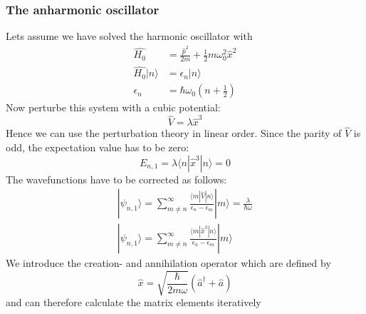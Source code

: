 \subsubsection{The anharmonic oscillator}
Lets assume we have solved the harmonic oscillator with 
\begin{align}
    \hat{H_0} &= \frac{\hat{p}^2}{2m} 
    + \frac{1}{2} m \omega_0^2\hat{x}^2 \\
    \hat{H_0}|n \rangle &= \epsilon_n |n \rangle \\
    \epsilon_n &= \hbar \omega_0 \left (n+ \frac{1}{2} \right)
\end{align}
Now perturbe this system with a cubic potential:
\begin{equation}
\hat{V} =\lambda \hat{x}^3
\end{equation}
Hence we can use the perturbation theory in linear order.
Since the parity of $\hat{V}$ is odd, the expectation value has 
to be zero:
\begin{equation}
    E_{n,1} = \lambda \langle n | \hat{x}^3 | n \rangle = 0 
\end{equation}
The wavefunctions have to be corrected as follows:
\begin{eqnarray}
    |\psi_{n,1} \rangle = \sum_{m\neq n}^{\infty}
    \frac{\langle m |\hat{V}|n \rangle}{\epsilon_n - \epsilon_m}  
    |m \rangle 
    = \frac{\lambda}{\hbar \omega}  \\
    |\psi_{n,1} \rangle = \sum_{m\neq n}^{\infty}
    \frac{\langle m |\hat{x}^3|n \rangle}{\epsilon_n - \epsilon_m}  
    |m \rangle 
\end{eqnarray}
We introduce the creation- and annihilation operator 
which are defined by 
\begin{equation}
    \hat{x} = \sqrt{\frac{\hbar}{2m\omega}}(\hat{a}^\dagger +
        \hat{a})
\end{equation} 
and can therefore calculate the matrix elements iteratively

